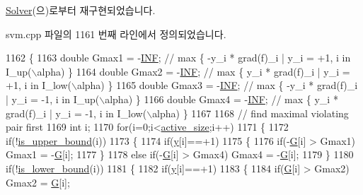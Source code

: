 \hyperlink{class_solver_ad3f6665a1ca590e56b3d51f8ddcc347c}{Solver}(으)로부터 재구현되었습니다.



svm.\+cpp 파일의 1161 번째 라인에서 정의되었습니다.


\begin{DoxyCode}
1162 \{
1163     \textcolor{keywordtype}{double} Gmax1 = -\hyperlink{svm_8cpp_a12c2040f25d8e3a7b9e1c2024c618cb6}{INF}; \textcolor{comment}{// max \{ -y\_i * grad(f)\_i | y\_i = +1, i in I\_up(\(\backslash\)alpha) \}}
1164     \textcolor{keywordtype}{double} Gmax2 = -\hyperlink{svm_8cpp_a12c2040f25d8e3a7b9e1c2024c618cb6}{INF}; \textcolor{comment}{// max \{ y\_i * grad(f)\_i | y\_i = +1, i in I\_low(\(\backslash\)alpha) \}}
1165     \textcolor{keywordtype}{double} Gmax3 = -\hyperlink{svm_8cpp_a12c2040f25d8e3a7b9e1c2024c618cb6}{INF}; \textcolor{comment}{// max \{ -y\_i * grad(f)\_i | y\_i = -1, i in I\_up(\(\backslash\)alpha) \}}
1166     \textcolor{keywordtype}{double} Gmax4 = -\hyperlink{svm_8cpp_a12c2040f25d8e3a7b9e1c2024c618cb6}{INF}; \textcolor{comment}{// max \{ y\_i * grad(f)\_i | y\_i = -1, i in I\_low(\(\backslash\)alpha) \}}
1167 
1168     \textcolor{comment}{// find maximal violating pair first}
1169     \textcolor{keywordtype}{int} i;
1170     \textcolor{keywordflow}{for}(i=0;i<\hyperlink{class_solver_a06ba1b87b3749cc545e573151b7beca0}{active\_size};i++)
1171     \{
1172         \textcolor{keywordflow}{if}(!\hyperlink{class_solver_a98d878b13d6f710fcaa0b16e657a37b6}{is\_upper\_bound}(i))
1173         \{
1174             \textcolor{keywordflow}{if}(\hyperlink{class_solver_a3acc1043d06dedf87f054ff3eea5c426}{y}[i]==+1)
1175             \{
1176                 \textcolor{keywordflow}{if}(-\hyperlink{class_solver_ad8ab27068f2e045591970aae1201afe9}{G}[i] > Gmax1) Gmax1 = -\hyperlink{class_solver_ad8ab27068f2e045591970aae1201afe9}{G}[i];
1177             \}
1178             \textcolor{keywordflow}{else}    \textcolor{keywordflow}{if}(-\hyperlink{class_solver_ad8ab27068f2e045591970aae1201afe9}{G}[i] > Gmax4) Gmax4 = -\hyperlink{class_solver_ad8ab27068f2e045591970aae1201afe9}{G}[i];
1179         \}
1180         \textcolor{keywordflow}{if}(!\hyperlink{class_solver_a5876eedb0a6de6954f6037af0992cbed}{is\_lower\_bound}(i))
1181         \{
1182             \textcolor{keywordflow}{if}(\hyperlink{class_solver_a3acc1043d06dedf87f054ff3eea5c426}{y}[i]==+1)
1183             \{   
1184                 \textcolor{keywordflow}{if}(\hyperlink{class_solver_ad8ab27068f2e045591970aae1201afe9}{G}[i] > Gmax2) Gmax2 = \hyperlink{class_solver_ad8ab27068f2e045591970aae1201afe9}{G}[i];

\end{DoxyCode}
